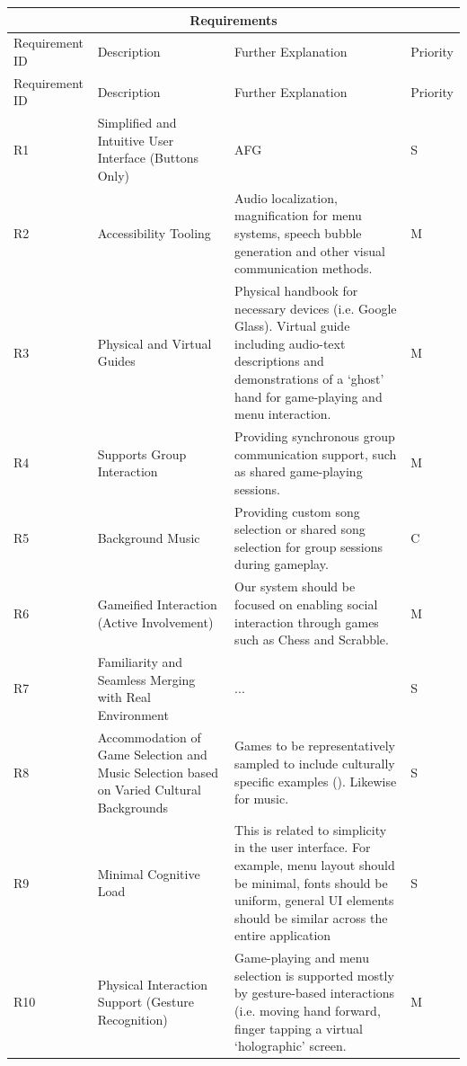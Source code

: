 \documentclass[12pt,a4paper]{article}
\begin{document}
\begin{longtable}{|p{3cm}|p{3cm}|p{3cm}|p{3cm}|}
\hline
\multicolumn{4}{|c|}{Requirements} \\ \hline
Requirement ID & Description & Further Explanation & Priority \\ \hline
\endfirsthead %
\hline
Requirement ID & Description & Further Explanation & Priority \\ \hline
\endhead %

\hline
R1 & Simplified and Intuitive User Interface (Buttons Only) & AFG & S \\ \hline
R2 & Accessibility Tooling & Audio localization, magnification for menu systems, speech bubble generation and other visual communication methods. & M \\ \hline
R3 & Physical and Virtual Guides & Physical handbook for necessary devices (i.e. Google Glass). Virtual guide including audio-text descriptions and demonstrations of a ‘ghost’ hand for game-playing and menu interaction. & M\\ \hline
R4 & Supports Group Interaction & Providing synchronous group communication support, such as shared game-playing sessions. & M\\ \hline
R5 & Background Music & Providing custom song selection or shared song selection for group sessions during gameplay. & C \\ \hline
R6 & Gameified Interaction (Active Involvement) & Our system should be focused on enabling social interaction through games such as Chess and Scrabble. & M \\ \hline
R7 & Familiarity and Seamless Merging with Real Environment & ... & S \\ \hline
R8 & Accommodation of Game Selection and Music Selection based on Varied Cultural Backgrounds  & Games to be representatively sampled to include culturally specific examples (). Likewise for music.  & S \\ \hline
R9 & Minimal Cognitive Load & This is related to simplicity in the user interface. For example, menu layout should be minimal, fonts should be uniform, general UI elements should be similar across the entire application & S \\ \hline
R10 & Physical Interaction Support (Gesture Recognition) & Game-playing and menu selection is supported mostly by gesture-based interactions (i.e. moving hand forward, finger tapping a virtual ‘holographic’ screen.  & M \\ \hline
\end{longtable}
\end{document}

